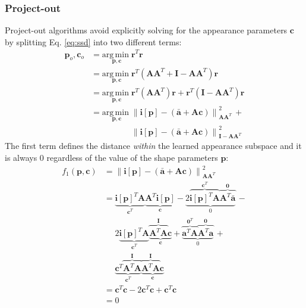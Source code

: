 \subsubsection{Project-out}
\label{sec:projectout}

Project-out algorithms avoid explicitly solving for the appearance parameters $\mathbf{c}$ by splitting Eq. \ref{eq:ssd} into two different terms:
\begin{equation}
    \begin{aligned}
        \mathbf{p}_o, \mathbf{c}_o & =  \underset{\mathbf{p}, \mathbf{c}}{\mathrm{arg\,min\;}} \mathbf{r}^T \mathbf{r} 
        \\
        & = \underset{\mathbf{p}, \mathbf{c}}{\mathrm{arg\,min\;}} \mathbf{r}^T (\mathbf{A}\mathbf{A}^T + \mathbf{I} - \mathbf{A}\mathbf{A}^T) \mathbf{r}
        \\
        & = \underset{\mathbf{p}, \mathbf{c}}{\mathrm{arg\,min\;}} \mathbf{r}^T (\mathbf{A}\mathbf{A}^T) \mathbf{r} + \mathbf{r}^T (\mathbf{I} - \mathbf{A}\mathbf{A}^T) \mathbf{r}
        \\
        & = \underset{\mathbf{p}, \mathbf{c}}{\mathrm{arg\,min\;}} \left\| \mathbf{i}[\mathbf{p}] - \left( \bar{\mathbf{a}} + \mathbf{A} \mathbf{c} \right) \right\|_{\mathbf{A}\mathbf{A}^T}^2 \, + 
        \\
        & \qquad \qquad \,\,\,\,\, \left\| \mathbf{i}[\mathbf{p}] - \left( \bar{\mathbf{a}} + \mathbf{A} \mathbf{c} \right) \right\|_{\mathbf{I} - \mathbf{A}\mathbf{A}^T}^2
    \label{eq:po_cost}
    \end{aligned}
\end{equation}
The first term defines the distance \emph{within} the learned appearance subspace and it is always $0$ regardless of the value of the shape parameters $\mathbf{p}$:
\begin{equation}
    \begin{aligned}
        f_1(\mathbf{p}, \mathbf{c}) & = \left\| \mathbf{i}[\mathbf{p}] - \left( \bar{\mathbf{a}} + \mathbf{A} \mathbf{c} \right) \right\|_{\mathbf{A}\mathbf{A}^T}^2
        \\
        & = \underbrace{\mathbf{i}[\mathbf{p}]^T \mathbf{A}}_{\mathbf{c}^T} \underbrace{\mathbf{A}^T \mathbf{i}[\mathbf{p}]}_{\mathbf{c}} - \underbrace{2\overbrace{\mathbf{i}[\mathbf{p}]^T \mathbf{A}}^{\mathbf{c}^T} \overbrace{\mathbf{A}^T \bar{\mathbf{a}}}^{\mathbf{0}}}_{0} \, - 
        \\
        & \quad \,\, 2\underbrace{\mathbf{i}[\mathbf{p}]^T \mathbf{A}}_{\mathbf{c}^T} \underbrace{\overbrace{\mathbf{A}^T \mathbf{A}}^{\mathbf{I}} \mathbf{c}}_{\mathbf{c}} + \underbrace{\overbrace{\mathbf{a}^T \mathbf{A}}^{\mathbf{0}^T} \overbrace{\mathbf{A}^T \mathbf{a}}^{\mathbf{0}}}_{0} \, +
        \\
        & \quad \,\, \underbrace{\mathbf{c}^T \overbrace{\mathbf{A}^T \mathbf{A}}^{\mathbf{I}}}_{\mathbf{c}^T} \underbrace{\overbrace{\mathbf{A}^T \mathbf{A}}^{\mathbf{I}} \mathbf{c}}_{\mathbf{c}}
        \\
        & = \mathbf{c}^T\mathbf{c} - 2\mathbf{c}^T\mathbf{c} + \mathbf{c}^T\mathbf{c}
        \\
        & = 0
    \end{aligned}
\end{equation}
